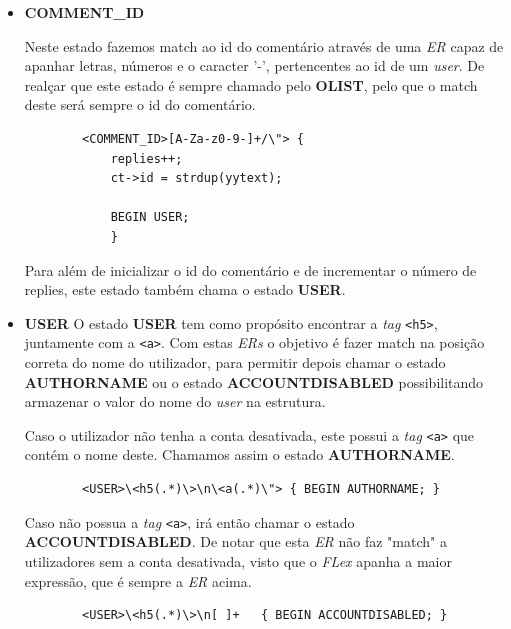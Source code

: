 \documentclass[a4paper,12pt]{report}
\newcommand*{\xml}[1]{\texttt{<#1>}}
\begin{document}
\vspace{2cm}

\begin{itemize}
    \item 
    \textbf{COMMENT\_ID}
    \par Neste estado fazemos match ao id do comentário através de uma \textit{ER} capaz de apanhar letras, números e o caracter '-', pertencentes ao id de um \textit{user}. De realçar que este estado é sempre chamado pelo \textbf{OLIST}, pelo que o match deste será sempre o id do comentário.
    
    \begin{verbatim}
        <COMMENT_ID>[A-Za-z0-9-]+/\"> {  
            replies++;
            ct->id = strdup(yytext);

            BEGIN USER; 
            }
    \end{verbatim}
    
    Para além de inicializar o id do comentário e de incrementar o número de replies, este estado também chama o estado \textbf{USER}.
    
\end{itemize}

\vspace{1cm}
\begin{itemize}
    \item 
    \textbf{USER}
    O estado \textbf{USER} tem como propósito encontrar a \textit{tag} \xml{h5}, juntamente com a \xml{a}. Com estas \textit{ERs} o objetivo é fazer match na posição correta do nome do utilizador, para permitir depois chamar o estado \textbf{AUTHORNAME} ou o estado \textbf{ACCOUNTDISABLED} possibilitando armazenar o valor do nome do \textit{user} na estrutura.
    
    \vspace{0.5cm}
    \par Caso o utilizador não tenha a conta desativada, este possui a \textit{tag} \xml{a} que contém o nome deste. Chamamos assim o estado \textbf{AUTHORNAME}.
    \begin{verbatim}
        <USER>\<h5(.*)\>\n\<a(.*)\"> { BEGIN AUTHORNAME; }
    \end{verbatim}{}
    
    \par Caso não possua a \textit{tag} \xml{a}, irá então chamar o estado \textbf{ACCOUNTDISABLED}.
    De notar que esta \textit{ER} não faz "match" a utilizadores sem a conta desativada, visto que o \textit{FLex} apanha a maior expressão, que é sempre a \textit{ER} acima.
    
        \begin{verbatim}
        <USER>\<h5(.*)\>\n[ ]+   { BEGIN ACCOUNTDISABLED; }
    \end{verbatim}{}
\end{itemize}
    
\end{document}
